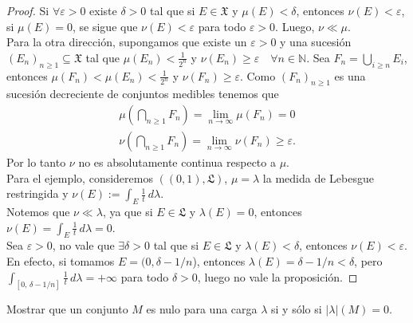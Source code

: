 \documentclass[12pt]{article}
\newenvironment{statement}[2][Ejercicio]{\begin{trivlist}
\item[\hskip \labelsep {\bfseries #1}\hskip \labelsep {\bfseries #2.}]}{\end{trivlist}}
\begin{document}
\begin{proof}
    Si \(\forall \varepsilon > 0 \) existe \(\delta > 0 \) tal que si \(E \in \mathfrak{X} \) y \(\mu(E) < \delta \), entonces \(\nu(E) < \varepsilon \), si \(\mu(E) = 0 \), se sigue que \(\nu(E) < \varepsilon \) para todo \(\varepsilon > 0 \). Luego, \(\nu \ll \mu \). \\
    Para la otra dirección, supongamos que existe un \(\varepsilon > 0 \) y una sucesión \((E_n)_{n \geq 1} \subseteq \mathfrak{X} \) tal que \(\mu(E_n) < \frac{1}{2^n} \) y \(\nu(E_n) \geq \varepsilon \quad \forall n \in \mathbb{N} \). Sea
    \(F_n = \bigcup_{i \geq n} E_i \), entonces \(\mu(F_n) < \mu(E_n) < \frac{1}{2^n} \) y \(\nu(F_n) \geq \varepsilon \). Como \((F_n)_{n \geq 1} \) es una sucesión decreciente de conjuntos medibles tenemos que \begin{align*}
        \mu \left (\bigcap_{n \geq 1} F_n \right) = \lim_{n \to \infty} \mu(F_n) = 0 \\
        \nu \left (\bigcap_{n \geq 1} F_n \right) = \lim_{n \to \infty} \nu(F_n) \geq \varepsilon.
    \end{align*}
    Por lo tanto \(\nu \) no es absolutamente continua respecto a \(\mu \). \\
    Para el ejemplo, consideremos \(((0,1), \mathfrak{L}) \), \(\mu = \lambda \) la medida de Lebesgue restringida y \(\nu(E) := \int_E \frac{1}{t} \, d\lambda \). \\
    Notemos que \(\nu \ll \lambda \), ya que si \(E \in \mathfrak{L} \) y \(\lambda(E) = 0 \), entonces \(\nu(E) = \int_E \frac{1}{t} \, d\lambda = 0 \). \\
    Sea \(\varepsilon > 0 \), no vale que \(\exists \delta > 0 \) tal que si \(E \in \mathfrak{L} \) y \(\lambda(E) < \delta \), entonces \(\nu(E) < \varepsilon \). En efecto, si tomamos \(E = (0, \delta - 1/n \)), entonces \(\lambda(E) = \delta - 1/n < \delta \), pero \(\int_{[0\text{, } \delta - 1/n]} \frac{1}{t} \, d\lambda = +\infty \) para todo \(\delta > 0 \), luego no vale la proposición.
\end{proof}

\begin{statement}{3}
    Mostrar que un conjunto \(M \) es nulo para una carga \(\lambda \) si y sólo si \(|\lambda|(M) = 0 \).
\end{statement}
\end{document}
